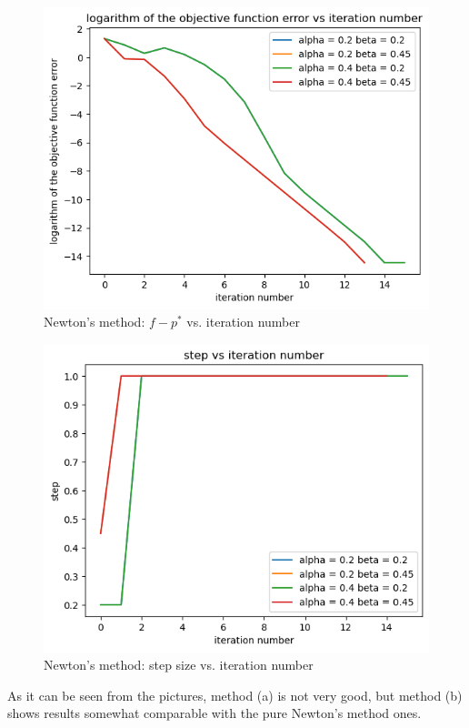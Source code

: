 \documentclass{article}
\begin{document}
\begin{figure}[H]
	\includegraphics[width=\linewidth]{9_31_b_obj_func.png}
	\caption{Newton's method: $f - p^*$ vs. iteration number}
\end{figure}

\begin{figure}[H]
	\includegraphics[width=\linewidth]{9_31_b_step.png}
	\caption{Newton's method: step size vs. iteration number}
\end{figure}


As it can be seen from the pictures, method (a) is not very good, but method (b) shows results somewhat 
comparable with the pure Newton's method ones.
\end{document}
